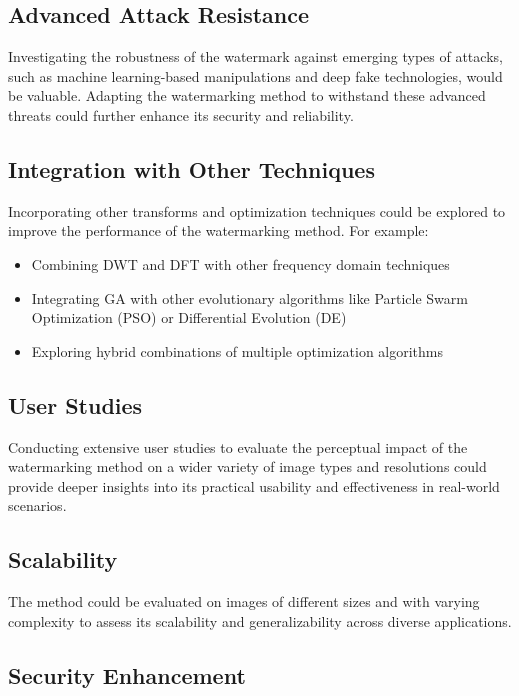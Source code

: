 \subsection{Advanced Attack Resistance}

Investigating the robustness of the watermark against emerging types of attacks, such as machine learning-based manipulations and deep fake technologies, would be valuable. Adapting the watermarking method to withstand these advanced threats could further enhance its security and reliability.

\subsection{Integration with Other Techniques}

Incorporating other transforms and optimization techniques could be explored to improve the performance of the watermarking method. For example:

\begin{itemize}
    \item Combining DWT and DFT with other frequency domain techniques
    \item Integrating GA with other evolutionary algorithms like Particle Swarm Optimization (PSO) or Differential Evolution (DE)
    \item Exploring hybrid combinations of multiple optimization algorithms
\end{itemize}

\subsection{User Studies}

Conducting extensive user studies to evaluate the perceptual impact of the watermarking method on a wider variety of image types and resolutions could provide deeper insights into its practical usability and effectiveness in real-world scenarios.

\subsection{Scalability}

The method could be evaluated on images of different sizes and with varying complexity to assess its scalability and generalizability across diverse applications.

\subsection{Security Enhancement}

